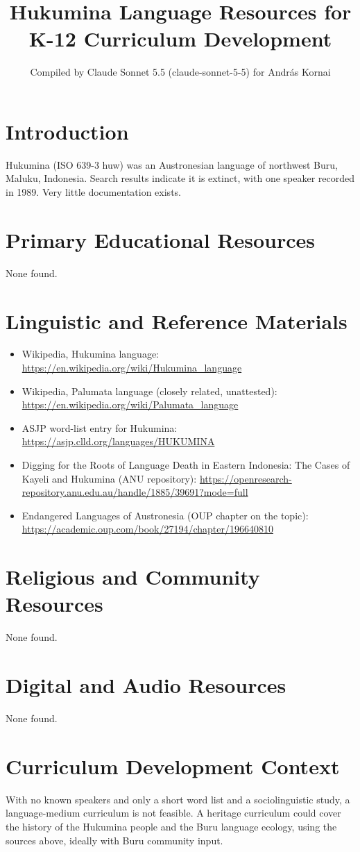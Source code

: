 \documentclass[12pt]{article}
\title{Hukumina Language Resources for K-12 Curriculum Development}
\author{Compiled by Claude Sonnet 5.5 (claude-sonnet-5-5) for Andr\'as Kornai}
\date{}
\begin{document}
\maketitle
\section{Introduction}
Hukumina (ISO 639-3 huw) was an Austronesian language of northwest Buru, Maluku, Indonesia. Search results indicate it is extinct, with one speaker recorded in 1989. Very little documentation exists.
\section{Primary Educational Resources}
None found.
\section{Linguistic and Reference Materials}
\begin{itemize}
\item Wikipedia, Hukumina language: \url{https://en.wikipedia.org/wiki/Hukumina_language}
\item Wikipedia, Palumata language (closely related, unattested): \url{https://en.wikipedia.org/wiki/Palumata_language}
\item ASJP word-list entry for Hukumina: \url{https://asjp.clld.org/languages/HUKUMINA}
\item Digging for the Roots of Language Death in Eastern Indonesia: The Cases of Kayeli and Hukumina (ANU repository): \url{https://openresearch-repository.anu.edu.au/handle/1885/39691?mode=full}
\item Endangered Languages of Austronesia (OUP chapter on the topic): \url{https://academic.oup.com/book/27194/chapter/196640810}
\end{itemize}
\section{Religious and Community Resources}
None found.
\section{Digital and Audio Resources}
None found.
\section{Curriculum Development Context}
With no known speakers and only a short word list and a sociolinguistic study, a language-medium curriculum is not feasible. A heritage curriculum could cover the history of the Hukumina people and the Buru language ecology, using the sources above, ideally with Buru community input.
\end{document}

